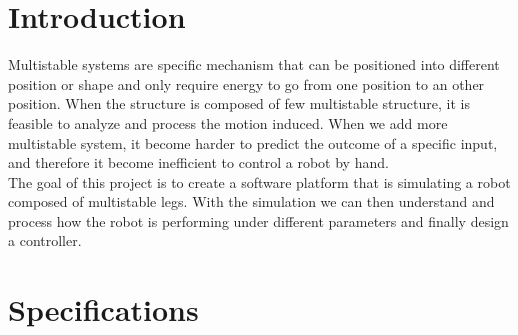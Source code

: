 

\section*{Introduction}
%
\setcounter{page}{1}
    Multistable systems are specific mechanism that can be positioned into different position or shape and only require energy to go from one position to an other position. When the structure is composed of few multistable structure, it is feasible to analyze and process the motion induced. When we add more multistable system, it become harder to predict the outcome of a specific input, and therefore it become inefficient to control a robot by hand. \\
    The goal of this project is to create a software platform that is simulating a robot composed of multistable legs. With the simulation we can then understand and process how the robot is performing under different parameters and finally design a controller.

\section*{Specifications}
%
